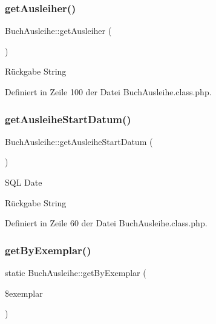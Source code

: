 \subsubsection{\texorpdfstring{get\+Ausleiher()}{getAusleiher()}}
{\footnotesize\ttfamily Buch\+Ausleihe\+::get\+Ausleiher (\begin{DoxyParamCaption}{ }\end{DoxyParamCaption})}

\begin{DoxyReturn}{Rückgabe}
String 
\end{DoxyReturn}


Definiert in Zeile 100 der Datei Buch\+Ausleihe.\+class.\+php.

\mbox{\label{class_buch_ausleihe_a6999838b1319b2023e8ce1ffd7e735b4}} 
\subsubsection{\texorpdfstring{get\+Ausleihe\+Start\+Datum()}{getAusleiheStartDatum()}}
{\footnotesize\ttfamily Buch\+Ausleihe\+::get\+Ausleihe\+Start\+Datum (\begin{DoxyParamCaption}{ }\end{DoxyParamCaption})}

S\+QL Date \begin{DoxyReturn}{Rückgabe}
String 
\end{DoxyReturn}


Definiert in Zeile 60 der Datei Buch\+Ausleihe.\+class.\+php.

\mbox{\label{class_buch_ausleihe_afa2d5973d51779266c1605e603cbcddd}} 
\subsubsection{\texorpdfstring{get\+By\+Exemplar()}{getByExemplar()}}
{\footnotesize\ttfamily static Buch\+Ausleihe\+::get\+By\+Exemplar (\begin{DoxyParamCaption}\item[{}]{\$exemplar }\end{DoxyParamCaption})\hspace{0.3cm}{\ttfamily [static]}}


